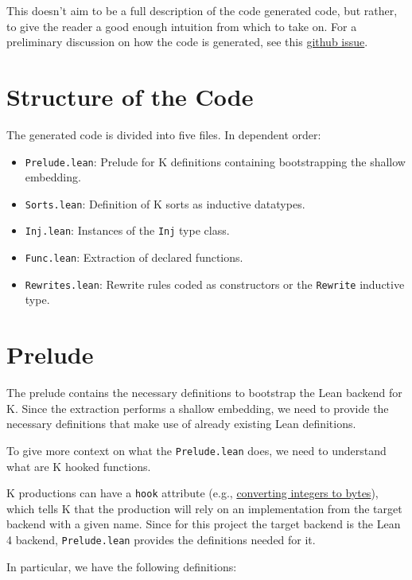 This doesn't aim to be a full description of the code generated code, but
rather, to give the reader a good enough intuition from which to take on. For a
preliminary discussion on how the code is generated, see this
\href{https://github.com/runtimeverification/k/issues/4552}{github issue}.

\section{Structure of the Code}

The generated code is divided into five files. In dependent order:

\begin{itemize}
\item \texttt{Prelude.lean}: Prelude for K definitions containing bootstrapping
  the shallow embedding.
\item \texttt{Sorts.lean}: Definition of K sorts as inductive datatypes.
\item \texttt{Inj.lean}: Instances of the \texttt{Inj} type class.
\item \texttt{Func.lean}: Extraction of declared functions.
\item \texttt{Rewrites.lean}: Rewrite rules coded as constructors or the
  \texttt{Rewrite} inductive type.
\end{itemize}

\section{Prelude}

The prelude contains the necessary definitions to bootstrap the Lean backend for
K. Since the extraction performs a shallow embedding, we need to provide the
necessary definitions that make use of already existing Lean definitions.

To give more context on what the \texttt{Prelude.lean} does, we need to
understand what are K hooked functions.

K productions can have a \texttt{hook} attribute (e.g., \href{https://github.com/runtimeverification/k/blob/master/k-distribution/include/kframework/builtin/domains.md#integer-and-bytes-conversion}{converting integers
  to bytes}), which tells K that the production will rely on an implementation
from the target backend with a given name. Since for this project the target
backend is the Lean 4 backend, \texttt{Prelude.lean} provides the definitions
needed for it.

In particular, we have the following definitions:

